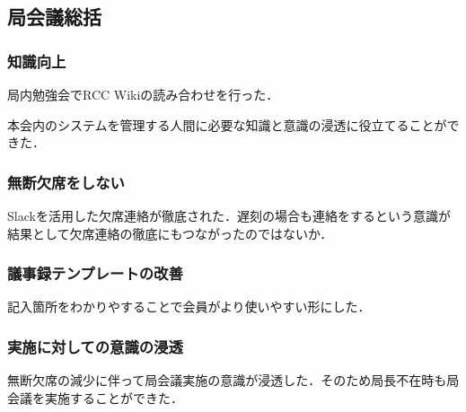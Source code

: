 \subsection*{局会議総括}


\subsubsection*{知識向上}

局内勉強会でRCC Wikiの読み合わせを行った．

本会内のシステムを管理する人間に必要な知識と意識の浸透に役立てることができた．

\subsubsection*{無断欠席をしない}

Slackを活用した欠席連絡が徹底された．遅刻の場合も連絡をするという意識が結果として欠席連絡の徹底にもつながったのではないか．

\subsubsection*{議事録テンプレートの改善}

記入箇所をわかりやすることで会員がより使いやすい形にした．

\subsubsection*{実施に対しての意識の浸透}

無断欠席の減少に伴って局会議実施の意識が浸透した．そのため局長不在時も局会議を実施することができた．
